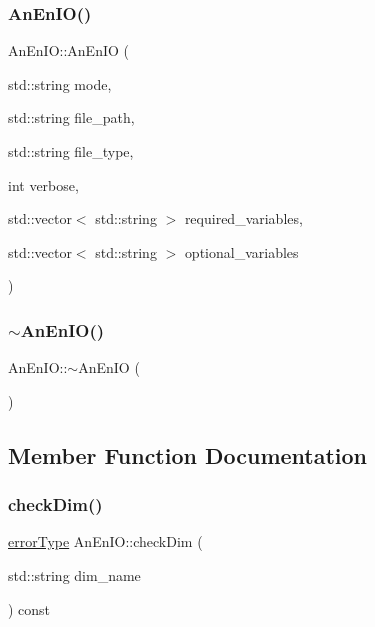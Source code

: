 \mbox{\label{class_an_en_i_o_ac040fa1dad19178f28b719f247e11b0d}} 
\subsubsection{\texorpdfstring{An\+En\+I\+O()}{AnEnIO()}\hspace{0.1cm}{\footnotesize\ttfamily [6/6]}}
{\footnotesize\ttfamily An\+En\+I\+O\+::\+An\+En\+IO (\begin{DoxyParamCaption}\item[{std\+::string}]{mode,  }\item[{std\+::string}]{file\+\_\+path,  }\item[{std\+::string}]{file\+\_\+type,  }\item[{int}]{verbose,  }\item[{std\+::vector$<$ std\+::string $>$}]{required\+\_\+variables,  }\item[{std\+::vector$<$ std\+::string $>$}]{optional\+\_\+variables }\end{DoxyParamCaption})}

\mbox{\label{class_an_en_i_o_a1e7aef95fd2a0c6aaef55998f48368f4}} 
\subsubsection{\texorpdfstring{$\sim$\+An\+En\+I\+O()}{~AnEnIO()}}
{\footnotesize\ttfamily An\+En\+I\+O\+::$\sim$\+An\+En\+IO (\begin{DoxyParamCaption}{ }\end{DoxyParamCaption})\hspace{0.3cm}{\ttfamily [virtual]}}



\subsection{Member Function Documentation}
\mbox{\label{class_an_en_i_o_a60bc1958d57097e308643dad2c9d87d0}} 
\subsubsection{\texorpdfstring{check\+Dim()}{checkDim()}}
{\footnotesize\ttfamily \mbox{\hyperlink{class_an_en_i_o_aa56bc1ec6610b86db4349bce20f9ead0}{error\+Type}} An\+En\+I\+O\+::check\+Dim (\begin{DoxyParamCaption}\item[{std\+::string}]{dim\+\_\+name }\end{DoxyParamCaption}) const}

